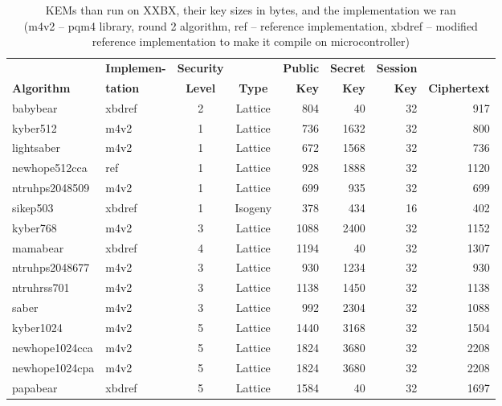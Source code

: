 \documentclass[10pt]{article}
\begin{document}
\begin{table}[ht]
  \centering
  \caption{KEMs than run on XXBX, their key sizes in bytes, and the implementation we ran\\
     {(\small m4v2 -- pqm4 library, round 2 algorithm, ref -- reference implementation,
      xbdref -- modified reference implementation to make it compile on microcontroller)}}\label{tab:sizeskem}
    \begin{tabular}{ll|c|c|rrrr}
                   & \textbf{Implemen-} & \textbf{Security} &             & \textbf{Public} & \textbf{Secret} & \textbf{Session} & \\ 
\textbf{Algorithm} & \textbf{tation}    &\textbf{Level} & \textbf{Type} & \textbf{Key} & \textbf{Key} & \textbf{Key} & \textbf{Ciphertext} \\ \hline
babybear	& xbdref & 2	         & Lattice &  804       &   40       & 32          &  917 \\
kyber512	& m4v2   & 1	         & Lattice &  736       & 1632       & 32          &  800 \\
lightsaber	& m4v2   & 1	         & Lattice &  672       & 1568       & 32          &  736 \\
newhope512cca	& ref    & 1	         & Lattice &  928       & 1888       & 32          & 1120 \\
ntruhps2048509  & m4v2   & 1             & Lattice &  699       &  935       & 32          &  699 \\
sikep503	& xbdref & 1	         & Isogeny &  378       &  434       & 16          &  402 \\
kyber768	& m4v2   & 3	         & Lattice & 1088       & 2400       & 32          & 1152 \\
mamabear	& xbdref & 4	         & Lattice & 1194       &   40       & 32          & 1307 \\
ntruhps2048677  & m4v2   & 3             & Lattice &  930       & 1234       & 32          &  930 \\
ntruhrss701     & m4v2   & 3             & Lattice & 1138       & 1450       & 32          & 1138 \\
saber    	& m4v2   & 3	         & Lattice &  992       & 2304       & 32          & 1088 \\
kyber1024	& m4v2   & 5	         & Lattice & 1440       & 3168       & 32          & 1504 \\
newhope1024cca	& m4v2   & 5	         & Lattice & 1824       & 3680       & 32          & 2208 \\
newhope1024cpa	& m4v2   & 5	         & Lattice & 1824       & 3680       & 32          & 2208 \\
papabear	& xbdref & 5	         & Lattice & 1584       &   40       & 32          & 1697 \\
    \end{tabular}
\end{table}
\end{document}
